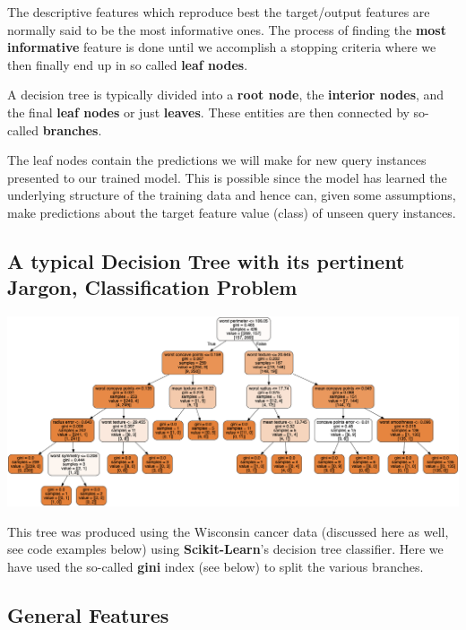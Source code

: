 \documentclass[%
oneside,                 %
final,                   %
10pt]{article}
\begin{document}
The descriptive features which reproduce best the target/output features are normally  said
to be the most informative ones. The process of finding the \textbf{most
informative} feature is done until we accomplish a stopping criteria
where we then finally end up in so called \textbf{leaf nodes}. 

A decision tree is typically divided into a \textbf{root node}, the \textbf{interior nodes},
and the final \textbf{leaf nodes} or just \textbf{leaves}. These entities are then connected by so-called \textbf{branches}.

The leaf nodes
contain the predictions we will make for new query instances presented
to our trained model. This is possible since the model has 
learned the underlying structure of the training data and hence can,
given some assumptions, make predictions about the target feature value
(class) of unseen query instances.

\subsection*{A typical Decision Tree with its pertinent Jargon, Classification Problem}



\vspace{6mm}

\centerline{\includegraphics[width=0.8\linewidth]{DataFiles/cancer.png}}

\vspace{6mm}



This tree was produced using the Wisconsin cancer data (discussed here as well, see code examples below) using \textbf{Scikit-Learn}'s decision tree classifier. Here we have used the so-called \textbf{gini} index (see below) to split the various branches.



\subsection*{General Features}
\end{document}
